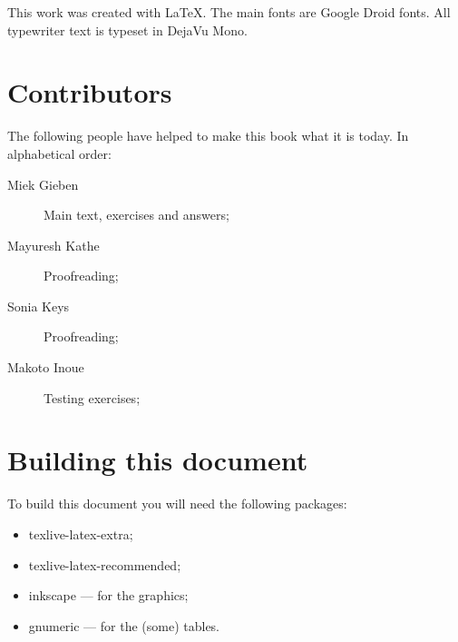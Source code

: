This work was created with \LaTeX. The main fonts are Google Droid
fonts.
All typewriter text is typeset in DejaVu Mono.

\section{Contributors}
The following people have helped to make this book what it is today.
In alphabetical order:
\begin{description}
\item[Miek Gieben] 
{Main text, exercises and answers;}
\item[Mayuresh Kathe]
{Proofreading;}
\item[Sonia Keys]
{Proofreading;}
\item[Makoto Inoue]
{Testing exercises;}
\end{description}

\section{Building this document}
To build this document you will need the following packages:
\begin{itemize}
\item{texlive-latex-extra;}
\item{texlive-latex-recommended;}
\item{inkscape --- for the graphics;}
\item{gnumeric --- for the (some) tables.}
\end{itemize}

